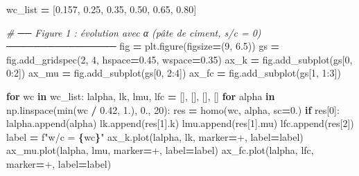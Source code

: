 \documentclass[
  a4paper,
  numbers=noendperiod,
  DIV=12]{scrreprt}
\newenvironment{Shaded}{\begin{snugshade}}{\end{snugshade}}
\newcommand{\BuiltInTok}[1]{#1}
\newcommand{\CommentTok}[1]{\textcolor[rgb]{0.56,0.35,0.01}{\textit{#1}}}
\newcommand{\ControlFlowTok}[1]{\textcolor[rgb]{0.13,0.29,0.53}{\textbf{#1}}}
\newcommand{\DecValTok}[1]{\textcolor[rgb]{0.00,0.00,0.81}{#1}}
\newcommand{\FloatTok}[1]{\textcolor[rgb]{0.00,0.00,0.81}{#1}}
\newcommand{\KeywordTok}[1]{\textcolor[rgb]{0.13,0.29,0.53}{\textbf{#1}}}
\newcommand{\NormalTok}[1]{#1}
\newcommand{\OperatorTok}[1]{\textcolor[rgb]{0.81,0.36,0.00}{\textbf{#1}}}
\newcommand{\SpecialCharTok}[1]{\textcolor[rgb]{0.81,0.36,0.00}{\textbf{#1}}}
\newcommand{\SpecialStringTok}[1]{\textcolor[rgb]{0.31,0.60,0.02}{#1}}
\newcommand{\StringTok}[1]{\textcolor[rgb]{0.31,0.60,0.02}{#1}}
\begin{document}
\begin{Shaded}
\begin{Highlighting}[]
\NormalTok{wc\_list }\OperatorTok{=}\NormalTok{ [}\FloatTok{0.157}\NormalTok{, }\FloatTok{0.25}\NormalTok{, }\FloatTok{0.35}\NormalTok{, }\FloatTok{0.50}\NormalTok{, }\FloatTok{0.65}\NormalTok{, }\FloatTok{0.80}\NormalTok{]}

\CommentTok{\# ── Figure 1 : évolution avec α (pâte de ciment, s/c = 0) ────────────────}
\NormalTok{fig }\OperatorTok{=}\NormalTok{ plt.figure(figsize}\OperatorTok{=}\NormalTok{(}\DecValTok{9}\NormalTok{, }\FloatTok{6.5}\NormalTok{))}
\NormalTok{gs  }\OperatorTok{=}\NormalTok{ fig.add\_gridspec(}\DecValTok{2}\NormalTok{, }\DecValTok{4}\NormalTok{, hspace}\OperatorTok{=}\FloatTok{0.45}\NormalTok{, wspace}\OperatorTok{=}\FloatTok{0.35}\NormalTok{)}
\NormalTok{ax\_k  }\OperatorTok{=}\NormalTok{ fig.add\_subplot(gs[}\DecValTok{0}\NormalTok{, }\DecValTok{0}\NormalTok{:}\DecValTok{2}\NormalTok{])}
\NormalTok{ax\_mu }\OperatorTok{=}\NormalTok{ fig.add\_subplot(gs[}\DecValTok{0}\NormalTok{, }\DecValTok{2}\NormalTok{:}\DecValTok{4}\NormalTok{])}
\NormalTok{ax\_fc }\OperatorTok{=}\NormalTok{ fig.add\_subplot(gs[}\DecValTok{1}\NormalTok{, }\DecValTok{1}\NormalTok{:}\DecValTok{3}\NormalTok{])}

\ControlFlowTok{for}\NormalTok{ wc }\KeywordTok{in}\NormalTok{ wc\_list:}
\NormalTok{    lalpha, lk, lmu, lfc }\OperatorTok{=}\NormalTok{ [], [], [], []}
    \ControlFlowTok{for}\NormalTok{ alpha }\KeywordTok{in}\NormalTok{ np.linspace(}\BuiltInTok{min}\NormalTok{(wc }\OperatorTok{/} \FloatTok{0.42}\NormalTok{, }\FloatTok{1.}\NormalTok{), }\FloatTok{0.}\NormalTok{, }\DecValTok{20}\NormalTok{):}
\NormalTok{        res }\OperatorTok{=}\NormalTok{ homo(wc, alpha, sc}\OperatorTok{=}\FloatTok{0.}\NormalTok{)}
        \ControlFlowTok{if}\NormalTok{ res[}\DecValTok{0}\NormalTok{]:}
\NormalTok{            lalpha.append(alpha)}
\NormalTok{            lk.append(res[}\DecValTok{1}\NormalTok{].k)}
\NormalTok{            lmu.append(res[}\DecValTok{1}\NormalTok{].mu)}
\NormalTok{            lfc.append(res[}\DecValTok{2}\NormalTok{])}
\NormalTok{    label }\OperatorTok{=} \SpecialStringTok{f"w/c = }\SpecialCharTok{\{}\NormalTok{wc}\SpecialCharTok{\}}\SpecialStringTok{"}
\NormalTok{    ax\_k.plot(lalpha,  lk,  marker}\OperatorTok{=}\StringTok{\textquotesingle{}+\textquotesingle{}}\NormalTok{, label}\OperatorTok{=}\NormalTok{label)}
\NormalTok{    ax\_mu.plot(lalpha, lmu, marker}\OperatorTok{=}\StringTok{\textquotesingle{}+\textquotesingle{}}\NormalTok{, label}\OperatorTok{=}\NormalTok{label)}
\NormalTok{    ax\_fc.plot(lalpha, lfc, marker}\OperatorTok{=}\StringTok{\textquotesingle{}+\textquotesingle{}}\NormalTok{, label}\OperatorTok{=}\NormalTok{label)}


\end{Highlighting}
\end{Shaded}
\end{document}
